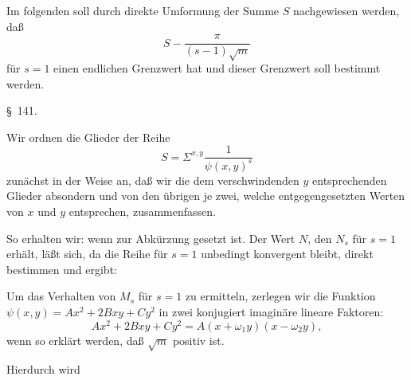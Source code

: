 Im folgenden soll durch direkte Umformung der Summe $S$
nachgewiesen werden, daß
\[ S - \frac{\pi}{(s-1)\sqrt{m}} \]
für $s=1$ einen endlichen Grenzwert hat und dieser Grenzwert
soll bestimmt werden.

\begin{center}
\S\ 141.\quad {}
\end{center}

Wir ordnen die Glieder der Reihe
\[ S = \Sigma^{x,y}\frac{1}{\psi(x,y)^s} \]
zunächst in der Weise an, daß wir die dem verschwindenden $y$
entsprechenden Glieder absondern und von den übrigen je zwei,
welche entgegengesetzten Werten von $x$ und $y$ entsprechen, zusammenfassen.

So erhalten wir:
wenn zur Abkürzung
gesetzt ist. Der Wert $N$, den $N_s$ für $s=1$ erhält, läßt sich,
da die Reihe für $s=1$ unbedingt konvergent bleibt, direkt
bestimmen und ergibt:

Um das Verhalten von $M_s$ für $s=1$ zu ermitteln, zerlegen
wir die Funktion $\psi(x,y) = Ax^2 + 2Bxy + Cy^2$ in zwei konjugiert
 imaginäre lineare Faktoren:
\[ Ax^2 + 2Bxy + Cy^2 = A(x+\omega_1y)(x-\omega_2y), \]
wenn
so erklärt werden, daß $\sqrt{m}$ positiv ist.

Hierdurch wird
